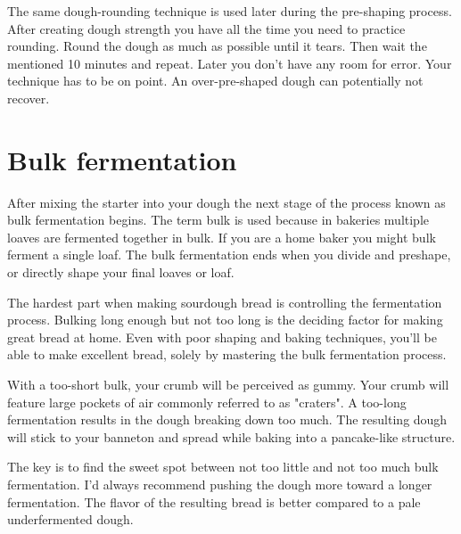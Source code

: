 The same dough-rounding technique is used later during
the pre-shaping process. After creating dough strength you
have all the time you need to practice rounding. Round the dough
as much as possible until it tears. Then wait the mentioned 10 minutes and repeat.
Later you don't have any room for error. Your technique has to be on point.
An over-pre-shaped dough can potentially not recover.


\section{Bulk fermentation}

After mixing the starter into your dough the next stage of
the process known as bulk fermentation begins. The term
bulk is used because in bakeries multiple loaves are fermented
together in bulk. If you are a home baker you might bulk
ferment a single loaf. The bulk fermentation ends when you
divide and preshape, or directly shape your final loaves or loaf.

The hardest part when making sourdough bread is controlling
the fermentation process. Bulking long enough but not too
long is the deciding factor for making great bread at home.
Even with poor shaping and baking techniques, you'll be able
to make excellent bread, solely by mastering the bulk
fermentation process.

With a too-short bulk, your crumb will be
perceived as gummy. Your crumb will feature large pockets of
air commonly referred to as "craters". A too-long fermentation
results in the dough breaking down too much. The resulting
dough will stick to your banneton and spread while baking
into a pancake-like structure.

The key is to find the sweet spot between not too little
and not too much bulk fermentation. I'd always recommend pushing
the dough more toward a longer fermentation. The
flavor of the resulting bread is better compared to a pale
underfermented dough.

